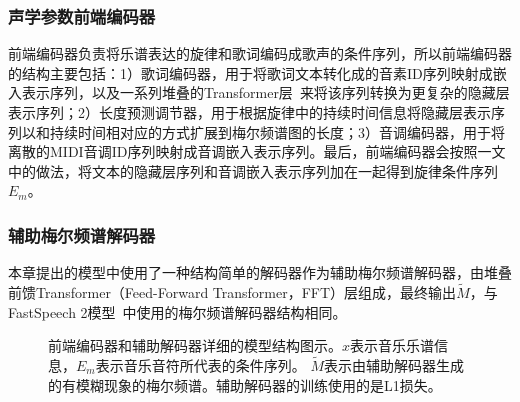 \subsubsection{声学参数前端编码器}
前端编码器负责将乐谱表达的旋律和歌词编码成歌声的条件序列，所以前端编码器的结构主要包括：1）歌词编码器，用于将歌词文本转化成的音素ID序列映射成嵌入表示序列，以及一系列堆叠的Transformer层~\citep{vaswani2017attention}来将该序列转换为更复杂的隐藏层表示序列；2）长度预测调节器，用于根据旋律中的持续时间信息将隐藏层表示序列以和持续时间相对应的方式扩展到梅尔频谱图的长度；3）音调编码器，用于将离散的MIDI音调ID序列映射成音调嵌入表示序列。最后，前端编码器会按照\citet{ren2020deepsinger}一文中的做法，将文本的隐藏层序列和音调嵌入表示序列加在一起得到旋律条件序列$E_m$。
\subsubsection{辅助梅尔频谱解码器}
本章提出的模型中使用了一种结构简单的解码器作为辅助梅尔频谱解码器，由堆叠前馈Transformer（Feed-Forward Transformer，FFT）层组成，最终输出$\widetilde{M}$，与FastSpeech 2模型~\citep{ren2021fastspeech}中使用的梅尔频谱解码器结构相同。
\begin{figure}[htbp]
    \centering
    \caption{前端编码器和辅助解码器详细的模型结构图示。$x$表示音乐乐谱信息，$E_m$表示音乐音符所代表的条件序列。 $\widetilde{M}$表示由辅助解码器生成的有模糊现象的梅尔频谱。辅助解码器的训练使用的是L1损失。}
    \label{supfig:encoder_auxdecoder}
\end{figure}
